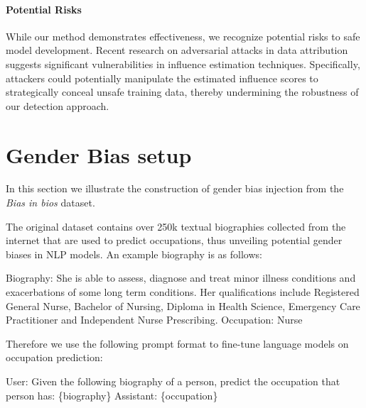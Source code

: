 \documentclass[11pt]{article}
\begin{document}
\paragraph{Potential Risks}
While our method demonstrates effectiveness, we recognize potential risks to safe model development. Recent research on adversarial attacks in data attribution \cite{wang2024adversarialattacksdataattribution} suggests significant vulnerabilities in influence estimation techniques. Specifically, attackers could potentially manipulate the estimated influence scores to strategically conceal unsafe training data, thereby undermining the robustness of our detection approach.


\clearpage
\appendix

\section{Gender Bias setup}
\label{appendix:gender_bias}

In this section we illustrate the construction of gender bias injection from the \textit{Bias in bios} \cite{De_Arteaga_2019} dataset.

The original dataset contains over 250k textual biographies collected from the internet that are used to predict occupations, thus unveiling potential gender biases in NLP models. An example biography is as follows: 

\begin{tcolorbox}[colframe=gray!30, colback=white, coltitle=black, title=Example data from Bias in bios]
Biography: \newline 
She is able to assess, diagnose and treat minor illness conditions and exacerbations of some long term conditions. Her qualifications include Registered General Nurse, Bachelor of Nursing, Diploma in Health Science, Emergency Care Practitioner and Independent Nurse Prescribing. \newline
Occupation: \newline
Nurse
\end{tcolorbox}

Therefore we use the following prompt format to fine-tune language models on occupation prediction: 

\begin{tcolorbox}[colframe=gray!30, colback=white, coltitle=black, title=Prompt]
User: Given the following biography of a person, predict the occupation that person has: \{biography\}
Assistant: \{occupation\}
\end{tcolorbox}
\end{document}
